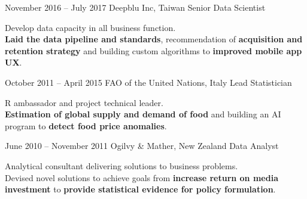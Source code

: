 \documentclass{tccv}
\begin{document}
\begin{eventlist}

\item{November 2016 -- July 2017}
  {Deepblu Inc, Taiwan}
  {Senior Data Scientist}

  Develop data capacity in all business function.\\

  \textbf{Laid the data pipeline and standards}, recommendation of
  \textbf{acquisition and retention strategy} and building custom
  algorithms to \textbf{improved mobile app UX}.\\


\item{October 2011 -- April 2015}
  {FAO of the United Nations, Italy}
  {Lead Statistician}

  R ambassador and project technical leader.\\
  
  \textbf{Estimation of global supply and demand of food} and building
  an AI program to \textbf{detect food price anomalies}. \\




\item{June 2010 -- November 2011}
     {Ogilvy \& Mather, New Zealand}
     {Data Analyst}

     Analytical consultant delivering solutions to business
     problems. \\

     Devised novel solutions to achieve goals from \textbf{increase
       return on media investment} to \textbf{provide statistical
       evidence for policy formulation}.


\end{eventlist}
\end{document}
